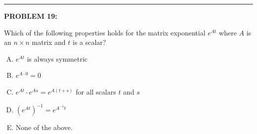 \documentclass[12pt]{amsart}
\newcommand{\divider}{
  \vspace{-1em} %
  \noindent
  \raisebox{-0.15ex}{\textbullet}%
  \hspace{0.5em}%
  \rule[0.5ex]{0.95\textwidth}{1.0pt}%
  \hspace{0.5em}%
  \raisebox{-0.15ex}{\textbullet}%
  \vspace{0em} %
}
\begin{document}

\divider
\newpage

{\bf PROBLEM 19:}

Which of the following properties holds for the matrix exponential $e^{At}$ where $A$ is an $n \times n$ matrix and $t$ is a scalar?

\begin{enumerate}[(A)]
\item $e^{At}$ is always symmetric
\item $e^{A \cdot 0} = 0$
\item $e^{At} \cdot e^{As} = e^{A(t+s)}$ for all scalars $t$ and $s$
\item $(e^{At})^{-1} = e^{A^{-1}t}$
\item None of the above.
\end{enumerate}

\end{document}
